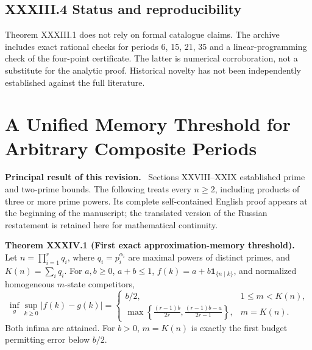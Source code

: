 \documentclass[11pt,a4paper,oneside]{book}
\newcommand{\one}{\mathbf 1}\newcommand{\ii}{\mathrm i}\newcommand{\dd}{\mathrm d}
\newcommand{\statement}[3]{\par\medskip\noindent\textbf{#1 #2 (#3).}\ }
\newcommand{\note}[1]{\par\medskip\noindent\textbf{#1}\ }
\begin{document}
\section*{XXXIII.4 Status and reproducibility}
Theorem XXXIII.1 does not rely on formal catalogue claims. The archive includes exact rational checks for periods 6, 15, 21, 35 and a linear-programming check of the four-point certificate. The latter is numerical corroboration, not a substitute for the analytic proof. Historical novelty has not been independently established against the full literature.
\chapter{A Unified Memory Threshold for Arbitrary Composite Periods}
\note{Principal result of this revision.} Sections XXVIII--XXIX established prime and two-prime bounds. The following treats every $n\ge2$, including products of three or more prime powers. Its complete self-contained English proof appears at the beginning of the manuscript; the translated version of the Russian restatement is retained here for mathematical continuity.
\statement{Theorem}{XXXIV.1}{First exact approximation-memory threshold} Let $n=\prod_{i=1}^r q_i$, where $q_i=p_i^{\alpha_i}$ are maximal powers of distinct primes, and $K(n)=\sum_iq_i$. For $a,b\ge0$, $a+b\le1$, $f(k)=a+b\one_{\{n\mid k\}}$, and normalized homogeneous $m$-state competitors,
\[\inf_g\sup_{k\ge0}|f(k)-g(k)|=\begin{cases}b/2,&1\le m<K(n),\\\displaystyle\max\left\{\frac{(r-1)b}{2r},\frac{(r-1)b-a}{2r-1}\right\},&m=K(n).\end{cases}\]
Both infima are attained. For $b>0$, $m=K(n)$ is exactly the first budget permitting error below $b/2$.
\end{document}
